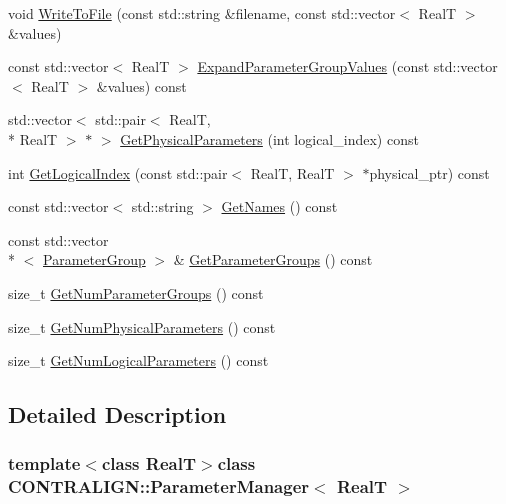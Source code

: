 \begin{DoxyCompactItemize}
\item 
void \hyperlink{class_c_o_n_t_r_a_l_i_g_n_1_1_parameter_manager_a836ef691153cf1c440da8cd3933395ad}{Write\+To\+File} (const std\+::string \&filename, const std\+::vector$<$ Real\+T $>$ \&values)
\item 
const std\+::vector$<$ Real\+T $>$ \hyperlink{class_c_o_n_t_r_a_l_i_g_n_1_1_parameter_manager_a0d879c87e8f22ade271707a3f5d1dd2a}{Expand\+Parameter\+Group\+Values} (const std\+::vector$<$ Real\+T $>$ \&values) const 
\item 
std\+::vector$<$ std\+::pair$<$ Real\+T, \\*
Real\+T $>$ $\ast$ $>$ \hyperlink{class_c_o_n_t_r_a_l_i_g_n_1_1_parameter_manager_ab417ba3f49ef3db98a9c357cde607a79}{Get\+Physical\+Parameters} (int logical\+\_\+index) const 
\item 
int \hyperlink{class_c_o_n_t_r_a_l_i_g_n_1_1_parameter_manager_a46dea3ed20a97d19ff4ddecf1b37d6cd}{Get\+Logical\+Index} (const std\+::pair$<$ Real\+T, Real\+T $>$ $\ast$physical\+\_\+ptr) const 
\item 
const std\+::vector$<$ std\+::string $>$ \hyperlink{class_c_o_n_t_r_a_l_i_g_n_1_1_parameter_manager_a16fcaa7317cd17ee128365d6cee0d966}{Get\+Names} () const 
\item 
const std\+::vector\\*
$<$ \hyperlink{struct_c_o_n_t_r_a_l_i_g_n_1_1_parameter_group}{Parameter\+Group} $>$ \& \hyperlink{class_c_o_n_t_r_a_l_i_g_n_1_1_parameter_manager_a6cfd4bf74ee61548e56d8d6027c74f83}{Get\+Parameter\+Groups} () const 
\item 
size\+\_\+t \hyperlink{class_c_o_n_t_r_a_l_i_g_n_1_1_parameter_manager_a0cec15e02161732c6e6a5a74cd95ff2b}{Get\+Num\+Parameter\+Groups} () const 
\item 
size\+\_\+t \hyperlink{class_c_o_n_t_r_a_l_i_g_n_1_1_parameter_manager_a7ec472071d84c62721664b2f78e97731}{Get\+Num\+Physical\+Parameters} () const 
\item 
size\+\_\+t \hyperlink{class_c_o_n_t_r_a_l_i_g_n_1_1_parameter_manager_ae71a84aa15b18cd85e52a5b4b455e199}{Get\+Num\+Logical\+Parameters} () const 
\end{DoxyCompactItemize}


\subsection{Detailed Description}
\subsubsection*{template$<$class Real\+T$>$class C\+O\+N\+T\+R\+A\+L\+I\+G\+N\+::\+Parameter\+Manager$<$ Real\+T $>$}




